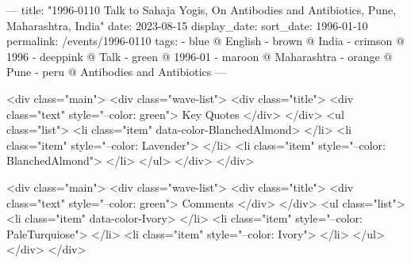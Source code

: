 ---
title: "1996-0110 Talk to Sahaja Yogis, On Antibodies and Antibiotics, Pune, Maharashtra, India"
date: 2023-08-15
display_date: 
sort_date: 1996-01-10
permalink: /events/1996-0110
tags:
  - blue @ English
  - brown @ India
  - crimson @ 1996
  - deeppink @ Talk
  - green @ 1996-01
  - maroon @ Maharashtra
  - orange @ Pune
  - peru @ Antibodies and Antibiotics
---

<div class="main">
  <div class="wave-list">
    <div class="title">
      <div class="text" style="--color: green">
        Key Quotes
      </div>
    </div>
    <ul class="list">
        <li class="item" data-color-BlanchedAlmond>
        </li>
        <li class="item" style="--color: Lavender">
        </li>
        <li class="item" style="--color: BlanchedAlmond">
        </li>
      </ul>
  </div>
</div>

<div class="main">
  <div class="wave-list">
    <div class="title">
      <div class="text" style="--color: green">
        Comments
      </div>
    </div>
    <ul class="list">
        <li class="item" data-color-Ivory>
        </li>
        <li class="item" style="--color: PaleTurquiose">
        </li>
        <li class="item" style="--color: Ivory">
        </li>
      </ul>
  </div>
</div>